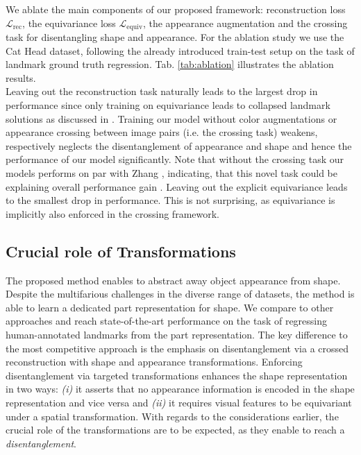 			We ablate the main components of our proposed framework: reconstruction loss $\mathcal{L}_{\textrm{rec}}$, the equivariance loss $\mathcal{L}_{\textrm{equiv}}$, the appearance augmentation and the crossing task for disentangling shape and appearance. For the ablation study we use the Cat Head dataset, following the already introduced train-test setup on the task of landmark ground truth regression. Tab. \ref{tab:ablation} illustrates the ablation results.\\
			Leaving out the reconstruction task naturally leads to the largest drop in performance since only training on equivariance leads to collapsed landmark solutions as discussed in \cite{zhang18}.
			Training our model without color augmentations or appearance crossing between image pairs (i.e. the crossing task) weakens, respectively neglects the disentanglement of appearance and shape and hence the performance of our model significantly. %
			Note that without the crossing task our models performs on par with Zhang \etal \cite{zhang18}, indicating, that this novel task could be explaining overall performance gain \wrt \cite{zhang18}. %
			Leaving out the explicit equivariance leads to the smallest drop in performance. This is not surprising, as equivariance is implicitly also enforced in the crossing framework.

	\subsection{Crucial role of Transformations}
		The proposed method enables to abstract away object appearance from shape.
		Despite the multifarious challenges in the diverse range of datasets, the method is able to learn a dedicated part representation for shape.
		We compare to other approaches and reach state-of-the-art performance on the task of regressing human-annotated landmarks from the part representation.
		The key difference to the most competitive approach \cite{zhang18} is the emphasis on disentanglement via a crossed reconstruction with shape and appearance transformations.
		Enforcing disentanglement via targeted transformations enhances the shape representation in two ways: \emph{(i)} it asserts that no appearance information is encoded in the shape representation and vice versa and \emph{(ii)} it requires visual features to be equivariant under a spatial transformation.
		With regards to the considerations earlier, the crucial role of the transformations are to be expected, as they enable to reach a \textit{disentanglement}.

